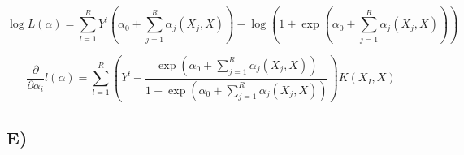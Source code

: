 \documentclass{report}
\begin{document}
\begin{equation}
  \log L(\alpha) =
  \sum_{l=1}^{R} Y^l
  (\alpha_0 + \sum_{j=1}^{R}\alpha_j(X_j,X))
  -
  \log(1+\exp(\alpha_0 + \sum_{j=1}^{R}\alpha_j(X_j,X)))
\end{equation}

\begin{equation}
  \frac{\partial}{\partial \alpha_i} l(\alpha) =
  \sum_{l=1}^{R}\left(Y^l -
  \frac{
  \exp(\alpha_0 + \sum_{j=1}^{R}\alpha_j(X_j,X))
  }{
  1+\exp(\alpha_0 + \sum_{j=1}^{R}\alpha_j(X_j,X))
  }
  \right)
  K(X_I,X)
\end{equation}

\subsection*{E)}
\end{document}
